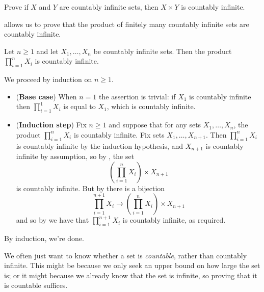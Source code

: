 \begin{exercise}
Prove if $X$ and $Y$ are countably infinite sets, then $X \times Y$ is countably infinite.
\end{exercise}

 allows us to prove that the product of finitely many countably infinite sets are countably infinite.

\begin{proposition}
\label{propFiniteProductOfCountableSetsIsCountable}
Let $n \ge 1$ and let $X_1, \dots, X_n$ be countably infinite sets. Then the product $\displaystyle \prod_{i=1}^n X_i$ is countably infinite.
\end{proposition}
\begin{cproof}
We proceed by induction on $n \ge 1$.
\begin{itemize}
\item (\textbf{Base case}) When $n=1$ the assertion is trivial: if $X_1$ is countably infinite then $\displaystyle \prod_{i=1}^1 X_i$ is equal to $X_1$, which is countably infinite.
\item (\textbf{Induction step}) Fix $n \ge 1$ and suppose that for any sets $X_1, \dots, X_n$, the product $\prod_{i=1}^n X_i$ is countably infinite. Fix sets $X_1, \dots, X_{n+1}$. Then $\prod_{i=1}^n X_i$ is countably infinite by the induction hypothesis, and $X_{n+1}$ is countably infinite by assumption, so by , the set
\[ \left( \prod_{i=1}^n X_i \right) \times X_{n+1} \]
is countably infinite. But by  there is a bijection 
\[ \prod_{i=1}^{n+1} X_i \to \left( \prod_{i=1}^n X_i \right) \times X_{n+1} \]
and so by  we have that $\prod_{i=1}^{n+1} X_i$ is countably infinite, as required.
\end{itemize}
By induction, we're done.
\end{cproof}

We often just want to know whether a set is \textit{countable}, rather than countably infinite. This might be because we only seek an upper bound on how large the set is; or it might because we already know that the set is infinite, so proving that it is countable suffices.

